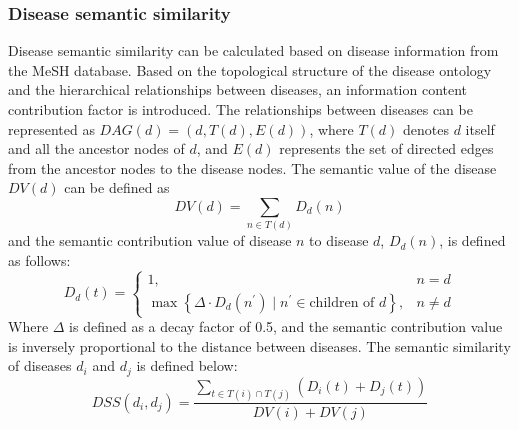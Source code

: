 \documentclass[lettersize,journal]{IEEEtran}
\begin{document}
\subsubsection{\textbf{Disease semantic similarity}}
Disease semantic similarity \cite{wang2010inferring} can be calculated based on disease information from the MeSH database. Based on the topological structure of the disease ontology and the hierarchical relationships between diseases, an information content contribution factor is introduced. The relationships between diseases can be represented as \(DAG(d) = (d, T(d), E(d))\), where \( T(d) \) denotes \( d \) itself and all the ancestor nodes of \( d \), and \( E(d) \) represents the set of directed edges from the ancestor nodes to the disease nodes. The semantic value of the disease \( DV(d) \) can be defined as
\begin{equation}
DV(d) = \sum_{n \in T(d)} D_d(n)
\end{equation}
and the semantic contribution value of disease \( n \) to disease \( d \), \( D_d(n) \), is defined as follows:\\
\begin{equation}
D_{d}(t) = 
\left\{
\begin{array}{ll}
	1,& n = d \\
	\max\left\{\Delta \cdot D_{d}\left(n^{\prime}\right) \mid n^{\prime} \in \text{children of } d\right\},& n\neq d
\end{array}
\right.
\end{equation}
Where \(\Delta\) is defined as a decay factor of 0.5, and the semantic contribution value is inversely proportional to the distance between diseases. The semantic similarity of diseases $d_i$ and $d_j$ is defined below:
\begin{equation}
DSS(d_i, d_j) = \frac{\sum_{t \in T(i) \cap T(j)} \left(D_i(t) + D_j(t)\right)}{DV(i) + DV(j)}
\end{equation}
\end{document}
